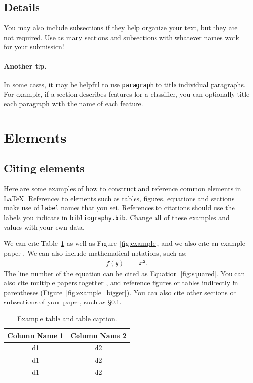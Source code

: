 \documentclass{anthology-ch}         %
\begin{document}
\subsection{Details} \label{sec:intro_details}

You may also include subsections if they help organize your text, but they
are not required. Use as many sections and subsections with whatever names work
for your submission!

\paragraph{Another tip.} In some cases, it may be helpful to use \texttt{paragraph} to title individual paragraphs. For example, if a section describes features for a classifier, you can optionally title each paragraph with the name of each feature. 

\section{Elements}

\subsection{Citing elements}

Here are some examples of how to construct and reference common elements in LaTeX. References to elements such as tables, figures, equations and sections make use of \texttt{label} names that you set. References to citations should use the labels you indicate in \texttt{bibliography.bib}. Change all of these examples and values with your own data. 

We can cite Table~\ref{tab:example} as well as Figure~\ref{fig:example}, and we also cite an example paper \cite{tettoni2024discoverability}.
We can also include mathematical notations, such as:
\begin{align}
f(y) &= x^2. \label{fig:squared}
\end{align}
The line number of the equation can be cited as
Equation~\ref{fig:squared}. You can also cite multiple papers together \cite{barré2024latent, levenson2024textual, bambaci2024steps}, and reference figures or tables indirectly in parentheses (Figure~\ref{fig:example_bigger}). You can also cite other sections or subsections of your paper, such as \S\ref{sec:intro_details}. 


\begin{table}[h]
  \centering 
  \begin{tabular}{cc}
    \toprule
    Column Name 1 & Column Name 2\\
    \midrule
    d1 & d2 \\
    d1 & d2 \\
    d1 & d2 \\
    \bottomrule
  \end{tabular}
  \caption{Example table and table caption.}
  \label{tab:example}
\end{table}
\end{document}
